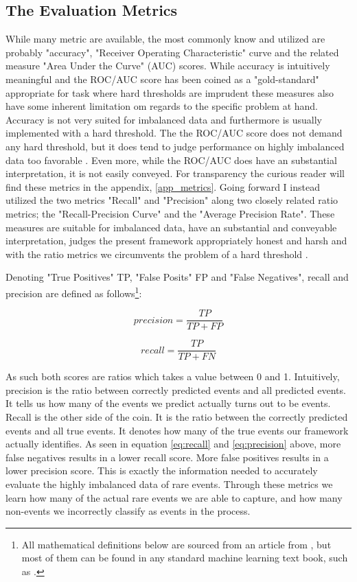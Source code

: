 \documentclass[a4paper]{article}
\begin{document}
\subsection{The Evaluation Metrics}

While many metric are available, the most commonly know and utilized are probably "accuracy", "Receiver Operating Characteristic" curve and the related measure "Area Under the Curve" (AUC) scores. While accuracy is intuitively meaningful and the ROC/AUC score has been coined as a "gold-standard" \citep[366]{perry_2013} appropriate for task where hard thresholds are imprudent\citep[1277-1278]{He_2008} these measures also have some inherent limitation om regards to the specific problem at hand. Accuracy is not very suited for imbalanced data \citep[1264]{He_2008} and furthermore is usually implemented with a hard threshold. The the ROC/AUC score does not demand any hard threshold, but it does tend to judge performance on highly imbalanced data too favorable \citep[1278]{He_2008}. Even more, while the ROC/AUC does have an substantial interpretation, it is not easily conveyed. For transparency the curious reader will find these metrics in the appendix, \autoref{app_metrics}. Going forward I instead utilized the two metrics "Recall" and "Precision" along two closely related ratio metrics; the "Recall-Precision Curve" and the "Average Precision Rate". These measures are suitable for imbalanced data, have an substantial and conveyable interpretation, judges the present framework appropriately honest and harsh and with the ratio metrics we circumvents the problem of a hard threshold \cite[1278]{He_2008}.

Denoting "True Positives" TP, "False Posits" FP and "False Negatives", recall and precision are defined as follows\footnote{All mathematical definitions below are sourced from an article from \cite{He_2008}, but most of them can be found in any standard machine learning text book, such as \cite{Friedman_2001}.}:

\[
precision = \frac{TP}{TP+FP} \tag{2} \label{eq:recall}
\]

\[
recall = \frac{TP}{TP+FN} \tag{3} \label{eq:precision}
\]

As such both scores are ratios which takes a value between 0 and 1. Intuitively, precision is the ratio between correctly predicted events and all predicted events. It tells us how many of the events we predict actually turns out to be events. Recall is the other side of the coin. It is the ratio between the correctly predicted events and all true events. It denotes how many of the true events our framework actually identifies. As seen in equation \ref{eq:recall} and \ref{eq:precision} above, more false negatives results in a lower recall score. More false positives results in a lower precision score. This is exactly the information needed to accurately evaluate the highly imbalanced data of rare events. Through these metrics we learn how many of the actual rare events we are able to capture, and how many non-events we incorrectly classify as events in the process.\par 
\end{document}
